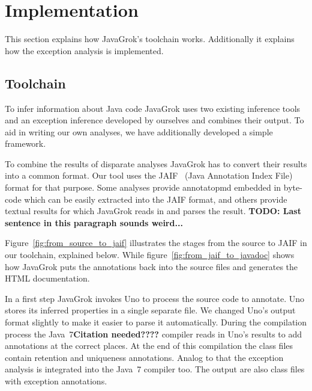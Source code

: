 \section{Implementation}
This section explains how JavaGrok's toolchain works. Additionally it explains
how the exception analysis is implemented.

\subsection{Toolchain}

\begin{figure*}
\centering
{}
\caption{JavaGrok's toolchain from source to JAIF}
\label{fig:from_source_to_jaif}
\end{figure*}

To infer information about Java code JavaGrok uses two existing inference tools and 
an exception inference developed by ourselves and combines their output. 
To aid in writing our own analyses, we have additionally developed a simple 
framework. 

To combine the results of disparate analyses JavaGrok has to convert their results
into a common format.  Our tool uses the JAIF~\cite{JAIF}
(Java Annotation Index File) format for that purpose.  Some analyses provide 
annotatopmd embedded in byte-code which can be easily extracted into the JAIF 
format, and others provide textual results for which JavaGrok reads in and parses the result.
{\bf TODO: Last sentence in this paragraph sounds weird...}

Figure~\ref{fig:from_source_to_jaif} 
illustrates the stages from the source to JAIF in our toolchain, explained 
below. While figure~\ref{fig:from_jaif_to_javadoc} shows how JavaGrok
puts the annotations back into the source files and generates the HTML
documentation.

\begin{figure*}
\centering
{}
\caption{JavaGrok's toolchain from JAIF to Javadoc}
\label{fig:from_jaif_to_javadoc}
\end{figure*}

In a first step JavaGrok invokes Uno to process the source code to annotate. 
Uno stores its inferred properties in a single separate file. We changed Uno's 
output format slightly to make it easier to parse it automatically.
During the compilation process the Java~7{\bf Citation needed????} compiler reads in Uno's results 
to add annotations at the correct places. 
At the end of this compilation the class files contain retention and uniqueness
annotations.
Analog to that the exception analysis is integrated into the Java~7 compiler too. 
The output are also class files with exception annotations.

